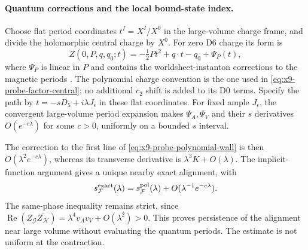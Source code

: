 \paragraph{Quantum corrections and the local bound-state index.}
Choose flat period coordinates $t^I=X^I/X^0$ in the large-volume
charge frame, and divide the holomorphic central charge by $X^0$.
For zero D6 charge its form is
\begin{equation}
 Z(0,P,q,q_0;t)=-\tfrac12P t^2+q\cdot t-q_0+\Psi_P(t),
 \label{eq:x9-probe-quantum-period}
\end{equation}
where $\Psi_P$ is linear in $P$ and contains the worldsheet-instanton
corrections to the magnetic periods
\cite[Appendix~B.2]{Alim:2010M5}. The polynomial charge convention
is the one used in \eqref{eq:x9-probe-factor-central}; no additional
$c_2$ shift is added to its D0 terms. Specify the path by
$t=-sD_5+i\lambda J_\epsilon$ in these flat coordinates.
For fixed ample $J_\epsilon$, the convergent large-volume period
expansion makes $\Psi_A,\Psi_V$ and their $s$ derivatives
$O(e^{-c\lambda})$ for some $c>0$, uniformly on a bounded
$s$ interval.

The correction to the first line of
\eqref{eq:x9-probe-polynomial-wall} is then
$O(\lambda^2e^{-c\lambda})$, whereas its transverse derivative
is $\lambda^3K+O(\lambda)$. The implicit-function argument gives
a unique nearby exact alignment, with
\begin{equation}
 s_{\mathcal F}^{\rm exact}(\lambda)
 =s_{\mathcal F}^{\rm pol}(\lambda)
       +O(\lambda^{-1}e^{-c\lambda}).
 \label{eq:x9-probe-asymptotic-wall}
\end{equation}
The same-phase inequality remains strict, since
$\operatorname{Re}(Z_{\mathcal G}\overline{Z_{\mathcal H}})
=\lambda^4v_Av_V+O(\lambda^2)>0$.
This proves persistence of the alignment near large volume without
evaluating the quantum periods. The estimate is not uniform at the contraction.

